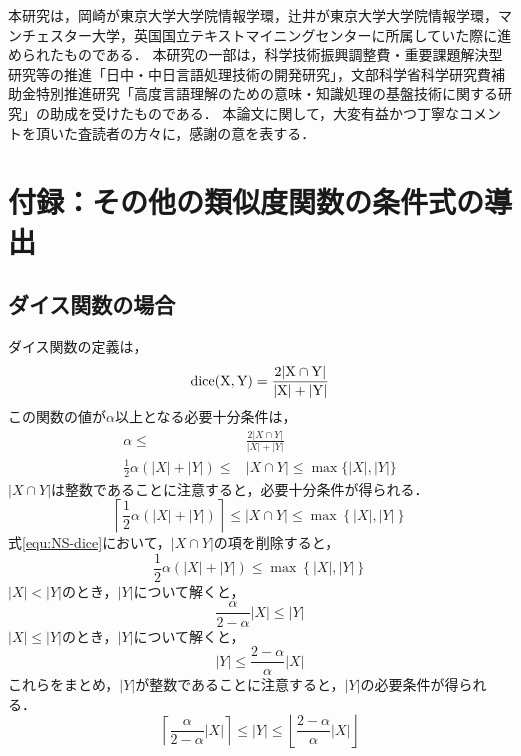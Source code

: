 \documentclass[japanese]{jnlp_JS2.0}
\begin{document}
本研究は，岡崎が東京大学大学院情報学環，辻井が東京大学大学院情報学環，マンチェスター大学，英国国立テキストマイニングセンターに所属していた際に進められたものである．
本研究の一部は，科学技術振興調整費・重要課題解決型研究等の推進「日中・中日言語処理技術の開発研究」，文部科学省科学研究費補助金特別推進研究「高度言語理解のための意味・知識処理の基盤技術に関する研究」の助成を受けたものである．
本論文に関して，大変有益かつ丁寧なコメントを頂いた査読者の方々に，感謝の意を表する．




\section*{付録：その他の類似度関数の条件式の導出}

\subsection*{ダイス関数の場合}

ダイス関数の定義は，
\begin{equation}
 \rm{dice}(X, Y) = \frac{2|X \cap Y|}{|X| + |Y|}
\end{equation}
この関数の値が$\alpha$以上となる必要十分条件は，
\begin{align}
 \alpha \leq& \frac{2|X \cap Y|}{|X| + |Y|} \\
 \frac{1}{2} \alpha (|X| + |Y|) \leq& |X \cap Y| \leq \max\{|X|, |Y|\} \label{equ:NS-dice}
\end{align}
$|X \cap Y|$は整数であることに注意すると，必要十分条件が得られる．
\begin{equation}
 \left\lceil \frac{1}{2} \alpha (|X| + |Y|) \right\rceil \leq |X \cap Y| \leq \max \left\{|X|, |Y|\right\}
\end{equation}
式\ref{equ:NS-dice}において，$|X \cap Y|$の項を削除すると，
\begin{equation}
 \frac{1}{2} \alpha (|X| + |Y|) \leq \max \left\{|X|, |Y|\right\}
\end{equation}
$|X| < |Y|$のとき，$|Y|$について解くと，
\begin{equation}
 \frac{\alpha}{2 - \alpha} |X| \leq |Y|
\end{equation}
$|X| \leq |Y|$のとき，$|Y|$について解くと，
\begin{equation}
 |Y| \leq \frac{2 - \alpha}{\alpha} |X|
\end{equation}
これらをまとめ，$|Y|$が整数であることに注意すると，$|Y|$の必要条件が得られる．
\begin{equation}
 \left\lceil \frac{\alpha}{2 - \alpha} |X| \right\rceil \leq |Y| \leq \left\lfloor \frac{2 - \alpha}{\alpha} |X| \right\rfloor
\end{equation}
\end{document}
